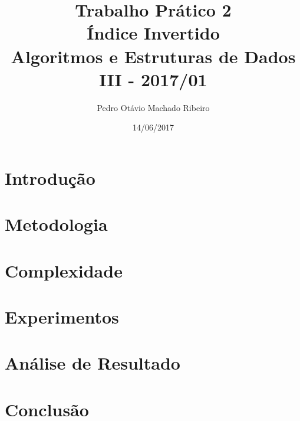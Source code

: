 \documentclass[
	12pt,
	a4paper,
	onepage,
	brazil
]{article}
\author{Pedro Otávio Machado Ribeiro}
\title{Trabalho Prático 2\\Índice Invertido\\Algoritmos e Estruturas de Dados III - 2017/01}
\date{14/06/2017}
\begin{document}
	\maketitle
	
	\section{Introdução}
	
	\section{Metodologia}
	
	\section{Complexidade}
	
	\section{Experimentos}
	
	\section{Análise de Resultado}
	
	\section{Conclusão}
	
	\nocite{*}
	
	\printbibliography[title=Referências]
\end{document}
